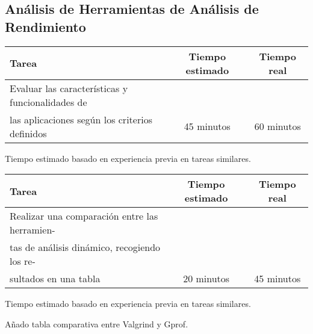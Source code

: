 \documentclass[12pt,a4paper]{article}
\begin{document}
\subsection{Análisis de Herramientas de Análisis de Rendimiento}
    \begin{center}
        \begin{tabular}{|l|c|c|}
            \hline
            \textbf{Tarea} & \textbf{Tiempo estimado} & \textbf{Tiempo real} \\
            \hline
            Evaluar las características y funcionalidades de
\\las aplicaciones según los criterios definidos & 45 minutos & 60 minutos \\
            \hline
        \end{tabular}
    \end{center}
    \begin{center}
        Tiempo estimado basado en experiencia previa en tareas similares.
    \end{center}
    \begin{center}
        \begin{tabular}{|l|c|c|}
            \hline
            \textbf{Tarea} & \textbf{Tiempo estimado} & \textbf{Tiempo real} \\
            \hline
            Realizar una comparación entre las herramien-
\\tas de análisis dinámico, recogiendo los re-
\\sultados en una tabla  & 20 minutos & 45 minutos \\
            \hline
        \end{tabular}
    \end{center}
    \begin{center}
        Tiempo estimado basado en experiencia previa en tareas similares.
    \end{center}
Añado tabla comparativa entre Valgrind y Gprof.
\end{document}
